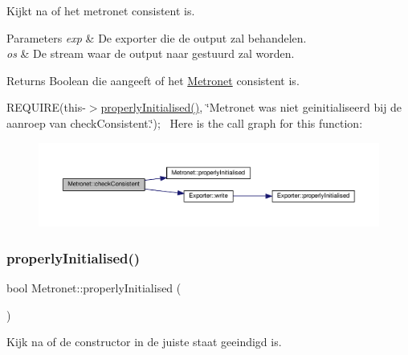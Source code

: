 Kijkt na of het metronet consistent is. 


\begin{DoxyParams}{Parameters}
{\em exp} & De exporter die de output zal behandelen. \\
\hline
{\em os} & De stream waar de output naar gestuurd zal worden. \\
\hline
\end{DoxyParams}
\begin{DoxyReturn}{Returns}
Boolean die aangeeft of het \hyperlink{class_metronet}{Metronet} consistent is.
\end{DoxyReturn}
R\+E\+Q\+U\+I\+RE(this-\/$>$\hyperlink{class_metronet_a3d2adce29a947f162924279b766de645}{properly\+Initialised()}, \char`\"{}\+Metronet was niet geinitialiseerd bij de aanroep van check\+Consistent.\char`\"{});~\newline
Here is the call graph for this function\+:
\nopagebreak
\begin{figure}[H]
\begin{center}
\leavevmode
\includegraphics[width=350pt]{class_metronet_abd223e3d0f745e3460a247dc667fce69_cgraph}
\end{center}
\end{figure}
\mbox{\label{class_metronet_a3d2adce29a947f162924279b766de645}} 
\subsubsection{\texorpdfstring{properly\+Initialised()}{properlyInitialised()}}
{\footnotesize\ttfamily bool Metronet\+::properly\+Initialised (\begin{DoxyParamCaption}{ }\end{DoxyParamCaption})}



Kijk na of de constructor in de juiste staat geeindigd is. 

